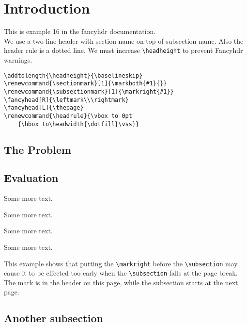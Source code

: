 \documentclass{article}
\renewcommand{\sectionmark}[1]{\markboth{#1}{}}
\renewcommand{\subsectionmark}[1]{\markright{#1}}
\renewcommand{\headrule}{\vbox to 0pt
    {\hbox to\headwidth{\dotfill}\vss}}
\begin{document}
\tableofcontents

\section{Introduction}

\begin{boxedminipage}{\textwidth}
This is example 16 in the fancyhdr documentation.\\
We use a two-line header with section name on top of subsection name. Also the header rule is a dotted line. We must increase \verb|\headheight| to prevent Fancyhdr warnings.
\begin{verbatim}
\addtolength{\headheight}{\baselineskip}
\renewcommand{\sectionmark}[1]{\markboth{#1}{}}
\renewcommand{\subsectionmark}[1]{\markright{#1}}
\fancyhead[R]{\leftmark\\\rightmark}
\fancyhead[L]{\thepage}
\renewcommand{\headrule}{\vbox to 0pt
    {\hbox to\headwidth{\dotfill}\vss}}
\end{verbatim}
\end{boxedminipage}

\subsection{The Problem}
\label{sec:problem}

\lipsum[1]

\subsection{Evaluation}

\lipsum

Some more text.

Some more text.

Some more text.

Some more text.

This example shows that putting the \verb+\markright+ before the \verb+\subsection+ may cause it to be effected too early when the \verb+\subsection+ falls at the page break. The mark is in the header on this page, while the subsection starts at the next page.


\subsection{Another subsection}

\lipsum[3]
\end{document}
